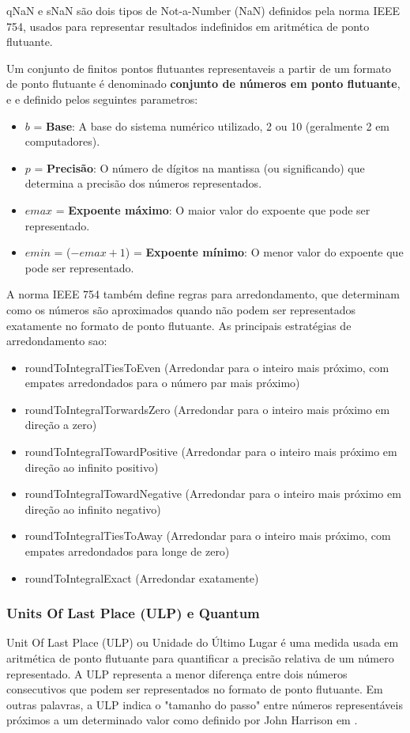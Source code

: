 qNaN e sNaN são dois tipos de Not-a-Number (NaN) definidos pela norma IEEE 754, usados para representar resultados indefinidos em aritmética de ponto flutuante.

Um conjunto de finitos pontos flutuantes representaveis a partir de um formato de ponto flutuante é denominado \textbf{conjunto de números em ponto flutuante}, e e definido pelos seguintes parametros:

\begin{itemize}
    \item $b$  = \textbf{Base}: A base do sistema numérico utilizado, 2 ou 10 (geralmente 2 em computadores).
    \item $p$ = \textbf{Precisão}: O número de dígitos na mantissa (ou significando) que determina a precisão dos números representados.
    \item $emax$ = \textbf{Expoente máximo}: O maior valor do expoente que pode ser representado.
    \item $emin$ = ($-emax + 1$) = \textbf{Expoente mínimo}: O menor valor do expoente que pode ser representado.
\end{itemize}

A norma IEEE 754 também define regras para arredondamento, que determinam como os números são aproximados quando não podem ser representados exatamente no formato de ponto flutuante. As principais estratégias de arredondamento sao:
\begin{itemize}
    \item roundToIntegralTiesToEven (Arredondar para o inteiro mais próximo, com empates arredondados para o número par mais próximo)
    \item roundToIntegralTorwardsZero (Arredondar para o inteiro mais próximo em direção a zero)
    \item roundToIntegralTowardPositive (Arredondar para o inteiro mais próximo em direção ao infinito positivo)
    \item roundToIntegralTowardNegative (Arredondar para o inteiro mais próximo em direção ao infinito negativo)
    \item roundToIntegralTiesToAway (Arredondar para o inteiro mais próximo, com empates arredondados para longe de zero)
    \item roundToIntegralExact (Arredondar exatamente)
\end{itemize}

\subsubsection{Units Of Last Place (ULP) e Quantum}
Unit Of Last Place (ULP) ou Unidade do Último Lugar é uma medida usada em aritmética de ponto flutuante para quantificar a precisão relativa de um número representado. A ULP representa a menor diferença entre dois números consecutivos que podem ser representados no formato de ponto flutuante. Em outras palavras, a ULP indica o "tamanho do passo" entre números representáveis próximos a um determinado valor como definido por John Harrison em \cite{HarrisonMachineCheckedFP}.

